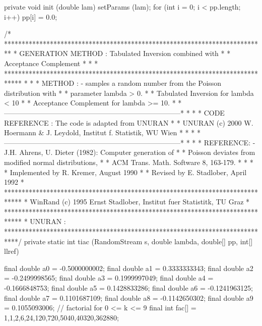 \begin{code}
\begin{hide} 

   private void init (double lam) {
      setParams (lam);
      for (int i = 0; i < pp.length; i++)
         pp[i] = 0.0;
   }


/* **************************************************************************
 * GENERATION METHOD : Tabulated Inversion combined with                     *
 *                     Acceptance Complement                                 *
 *                                                                           *
 *****************************************************************************
 *                                                                           *
 * METHOD :   -  samples a random number from the Poisson distribution with  *
 *               parameter lambda > 0.                                       *
 *               Tabulated Inversion for  lambda < 10                        *
 *               Acceptance Complement for lambda >= 10.                     *
 *---------------------------------------------------------------------------*
 *                                                                           *
 * CODE REFERENCE : The code is adapted from UNURAN                          *
 * UNURAN (c) 2000  W. Hoermann & J. Leydold, Institut f. Statistik, WU Wien *
 *                                                                           *
 *---------------------------------------------------------------------------*
 *                                                                           *
 * REFERENCE: - J.H. Ahrens, U. Dieter (1982): Computer generation of        * 
 *              Poisson deviates from modified normal distributions,         *
 *              ACM Trans. Math. Software 8, 163-179.                        *
 *                                                                           *
 * Implemented by R. Kremer, August 1990                                     *
 * Revised by E. Stadlober, April 1992                                       *
 *****************************************************************************
 *    WinRand (c) 1995 Ernst Stadlober, Institut fuer Statistitk, TU Graz    *
 *****************************************************************************
 *  UNURAN :  
 ****************************************************************************/
   private static int tiac (RandomStream s, double lambda, 
                            double[] pp, int[] llref) {
      final double  a0 = -0.5000000002;
      final double  a1 =  0.3333333343;
      final double  a2 = -0.2499998565;
      final double  a3 =  0.1999997049;
      final double  a4 = -0.1666848753;
      final double  a5 =  0.1428833286;
      final double  a6 = -0.1241963125;
      final double  a7 =  0.1101687109;
      final double  a8 = -0.1142650302;
      final double  a9 =  0.1055093006;
      // factorial for 0 <= k <= 9
      final int fac[] = {1,1,2,6,24,120,720,5040,40320,362880};

}
\end{hide}
\end{code}

